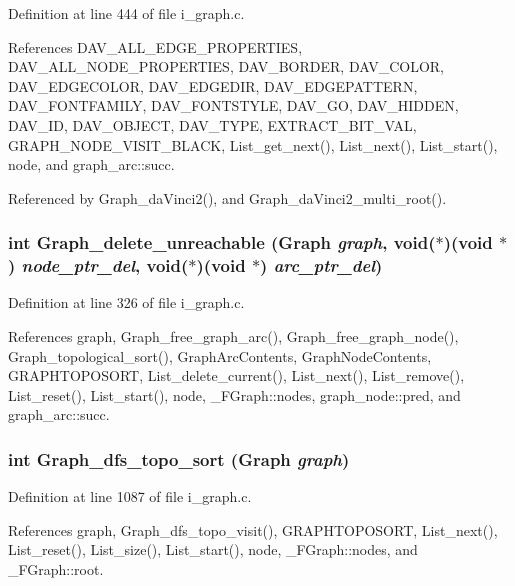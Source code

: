 Definition at line 444 of file i\_\-graph.c.

References DAV\_\-ALL\_\-EDGE\_\-PROPERTIES, DAV\_\-ALL\_\-NODE\_\-PROPERTIES, DAV\_\-BORDER, DAV\_\-COLOR, DAV\_\-EDGECOLOR, DAV\_\-EDGEDIR, DAV\_\-EDGEPATTERN, DAV\_\-FONTFAMILY, DAV\_\-FONTSTYLE, DAV\_\-GO, DAV\_\-HIDDEN, DAV\_\-ID, DAV\_\-OBJECT, DAV\_\-TYPE, EXTRACT\_\-BIT\_\-VAL, GRAPH\_\-NODE\_\-VISIT\_\-BLACK, List\_\-get\_\-next(), List\_\-next(), List\_\-start(), node, and graph\_\-arc::succ.

Referenced by Graph\_\-da\-Vinci2(), and Graph\_\-da\-Vinci2\_\-multi\_\-root().
\subsubsection{\setlength{\rightskip}{0pt plus 5cm}int Graph\_\-delete\_\-unreachable (\bf{Graph} {\em graph}, void($\ast$)(void $\ast$) {\em node\_\-ptr\_\-del}, void($\ast$)(void $\ast$) {\em arc\_\-ptr\_\-del})}\label{i__graph_8c_cf09090933cd4d8c8dc7dbc024663472}




Definition at line 326 of file i\_\-graph.c.

References graph, Graph\_\-free\_\-graph\_\-arc(), Graph\_\-free\_\-graph\_\-node(), Graph\_\-topological\_\-sort(), Graph\-Arc\-Contents, Graph\-Node\-Contents, GRAPHTOPOSORT, List\_\-delete\_\-current(), List\_\-next(), List\_\-remove(), List\_\-reset(), List\_\-start(), node, \_\-FGraph::nodes, graph\_\-node::pred, and graph\_\-arc::succ.
\subsubsection{\setlength{\rightskip}{0pt plus 5cm}int Graph\_\-dfs\_\-topo\_\-sort (\bf{Graph} {\em graph})}\label{i__graph_8c_73b154de6c14de1fcd726763e52a686d}




Definition at line 1087 of file i\_\-graph.c.

References graph, Graph\_\-dfs\_\-topo\_\-visit(), GRAPHTOPOSORT, List\_\-next(), List\_\-reset(), List\_\-size(), List\_\-start(), node, \_\-FGraph::nodes, and \_\-FGraph::root.

